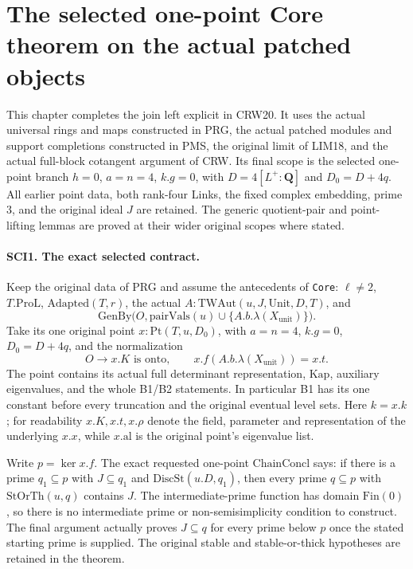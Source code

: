 \section{The selected one-point Core theorem on the actual patched objects}
\label{sec:selected-core-v040}

This chapter completes the join left explicit in CRW20. It uses the
actual universal rings and maps constructed in PRG, the actual
patched modules and support completions constructed in PMS, the
original limit of LIM18, and the actual full-block cotangent argument
of CRW. Its final scope is the selected one-point branch
\(h=0\), \(a=n=4\), \(k.g=0\), with
\(D=4[L^+:\mathbf Q]\) and \(D_0=D+4q\).
All earlier point data, both rank-four Links, the fixed complex
embedding, prime \(3\), and the original ideal \(J\) are retained.
The generic quotient-pair and point-lifting lemmas are proved at
their wider original scopes where stated.

\paragraph{SCI1. The exact selected contract.}
\label{claim:SCI1}
Keep the original data of PRG and assume the antecedents of
\texttt{Core}: \(\ell\ne2\), \(T.\mathrm{ProL}\),
\(\mathrm{Adapted}(T,r)\), the actual
\(A:\mathrm{TWAut}(u,J,\mathrm{Unit},D,T)\), and
\[
 \mathrm{GenBy}\bigl(O,\mathrm{pairVals}(u)\cup
       \{A.b.\lambda(X_{\mathrm{unit}})\}\bigr).            \tag{SCI.1}
\]
Take its one original point \(x:\mathrm{Pt}(T,u,D_0)\), with
\(a=n=4\), \(k.g=0\), \(D_0=D+4q\), and the normalization
\[
 O\longrightarrow x.K\text{ is onto},\qquad
 x.f(A.b.\lambda(X_{\mathrm{unit}}))=x.t.                  \tag{SCI.2}
\]
The point contains its actual full determinant representation,
\(\mathrm{Kap}\), auxiliary eigenvalues, and the whole B1/B2
statements. In particular B1 has its one constant before every
truncation and the original eventual level sets.
Here \(k=x.k\); for readability \(x.K,x.t,x.\rho\) denote the
field, parameter and representation of the underlying \(x.x\),
while \(x.\mathrm{al}\) is the original point's eigenvalue list.

Write \(p=\ker x.f\). The exact requested one-point
\(\mathrm{ChainConcl}\) says: if there is a prime
\(q_1\subseteq p\) with \(J\subseteq q_1\) and
\(\mathrm{DiscSt}(u.D,q_1)\), then every prime
\(q\subseteq p\) with \(\mathrm{StOrTh}(u,q)\) contains
\(J\). The intermediate-prime function has domain
\(\mathrm{Fin}(0)\), so there is no intermediate prime or
non-semisimplicity condition to construct. The final argument
actually proves \(J\subseteq q\) for every prime below \(p\)
once the stated starting prime is supplied. The original stable
and stable-or-thick hypotheses are retained in the theorem.

